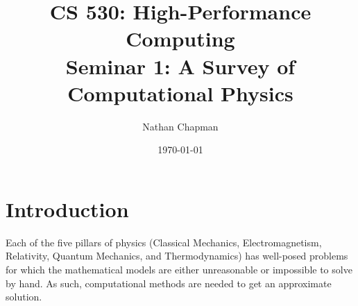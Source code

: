 \documentclass{report}
\title{CS 530: High-Performance Computing \\ Seminar 1: A Survey of Computational Physics}
\author{Nathan Chapman}
\affil{Department of Computer Science \\ Central Washington University}
\date{\today}
\begin{document}
\maketitle

\tableofcontents









\chapter{Introduction}

    Each of the five pillars of physics (Classical Mechanics, Electromagnetism, Relativity, Quantum Mechanics, and Thermodynamics) has well-posed problems for which the mathematical models are either unreasonable or impossible to solve by hand.  As such, computational methods are needed to get an approximate solution.  
    
\end{document}
